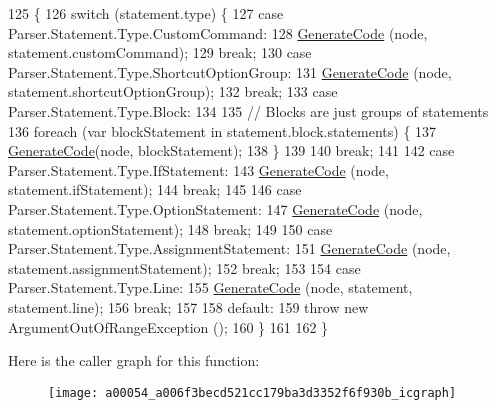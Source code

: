 \begin{DoxyCode}
125                                                                  \{
126             \textcolor{keywordflow}{switch} (statement.type) \{
127             \textcolor{keywordflow}{case} Parser.Statement.Type.CustomCommand:
128                 \hyperlink{a00054_a006f3becd521cc179ba3d3352f6f930b}{GenerateCode} (node, statement.customCommand);
129                 \textcolor{keywordflow}{break};
130             \textcolor{keywordflow}{case} Parser.Statement.Type.ShortcutOptionGroup:
131                 \hyperlink{a00054_a006f3becd521cc179ba3d3352f6f930b}{GenerateCode} (node, statement.shortcutOptionGroup);
132                 \textcolor{keywordflow}{break};
133             \textcolor{keywordflow}{case} Parser.Statement.Type.Block:
134 
135                 \textcolor{comment}{// Blocks are just groups of statements}
136                 \textcolor{keywordflow}{foreach} (var blockStatement \textcolor{keywordflow}{in} statement.block.statements) \{
137                     \hyperlink{a00054_a006f3becd521cc179ba3d3352f6f930b}{GenerateCode}(node, blockStatement);
138                 \}
139 
140                 \textcolor{keywordflow}{break};
141 
142             \textcolor{keywordflow}{case} Parser.Statement.Type.IfStatement:
143                 \hyperlink{a00054_a006f3becd521cc179ba3d3352f6f930b}{GenerateCode} (node, statement.ifStatement);
144                 \textcolor{keywordflow}{break};
145 
146             \textcolor{keywordflow}{case} Parser.Statement.Type.OptionStatement:
147                 \hyperlink{a00054_a006f3becd521cc179ba3d3352f6f930b}{GenerateCode} (node, statement.optionStatement);
148                 \textcolor{keywordflow}{break};
149 
150             \textcolor{keywordflow}{case} Parser.Statement.Type.AssignmentStatement:
151                 \hyperlink{a00054_a006f3becd521cc179ba3d3352f6f930b}{GenerateCode} (node, statement.assignmentStatement);
152                 \textcolor{keywordflow}{break};
153 
154             \textcolor{keywordflow}{case} Parser.Statement.Type.Line:
155                 \hyperlink{a00054_a006f3becd521cc179ba3d3352f6f930b}{GenerateCode} (node, statement, statement.line);
156                 \textcolor{keywordflow}{break};
157 
158             \textcolor{keywordflow}{default}:
159                 \textcolor{keywordflow}{throw} \textcolor{keyword}{new} ArgumentOutOfRangeException ();
160             \}
161 
162         \}
\end{DoxyCode}


Here is the caller graph for this function\-:
\nopagebreak
\begin{figure}[H]
\begin{center}
\leavevmode
\texttt{[image: a00054\_a006f3becd521cc179ba3d3352f6f930b\_icgraph]}
\end{center}
\end{figure}


